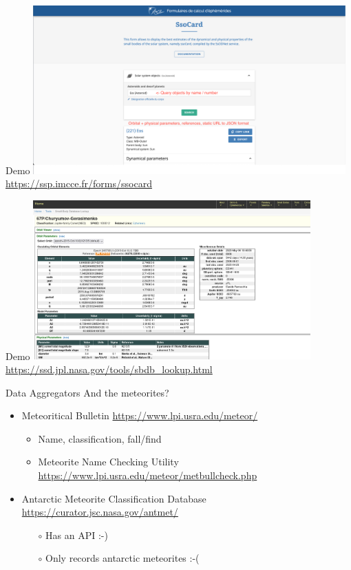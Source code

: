 \begin{frame}[t]{Demo}
  \includegraphics[width=0.9\textwidth]{gfx/demo_ssocard.png}
  \url{https://ssp.imcce.fr/forms/ssocard}
\end{frame}

\begin{frame}[t]{Demo}
  \includegraphics[width=0.8\textwidth]{gfx/demo_jpl.png}
  \url{https://ssd.jpl.nasa.gov/tools/sbdb_lookup.html}
\end{frame}

\begin{frame}[t]{Data Aggregators}
    And the meteorites?
    \smallskip
    \begin{itemize}
      \item Meteoritical Bulletin {\tiny\url{https://www.lpi.usra.edu/meteor/}}
        \begin{itemize}
          \item Name, classification, fall/find
          \item Meteorite Name Checking Utility {\tiny\url{https://www.lpi.usra.edu/meteor/metbullcheck.php}}
        \end{itemize}
        \vspace{0.5em}
      \item Antarctic Meteorite Classification Database {\tiny\url{https://curator.jsc.nasa.gov/antmet/}}
        \begin{itemize}
          \item[$\circ$] Has an API :-)
          \item[$\circ$] Only records antarctic meteorites :-(
        \end{itemize}
    \end{itemize}

\end{frame}

